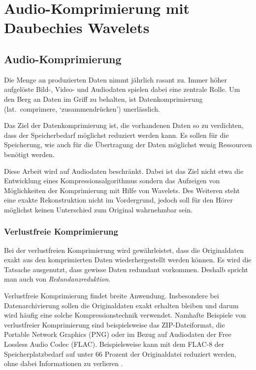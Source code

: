 %
%
%
\chapter{Audio-Komprimierung mit Daubechies Wavelets\label{chapter:compress}}
\begin{refsection}

\section{Audio-Komprimierung}
Die Menge an produzierten Daten nimmt jährlich rasant zu.
Immer höher aufgelöste Bild-, Video- und Audiodaten spielen dabei eine zentrale Rolle.
Um den Berg an Daten im Griff zu behalten, ist Datenkomprimierung (lat.~comprimere, `zusammendrücken') unerlässlich. 
%

Das Ziel der Datenkomprimierung ist, die vorhandenen Daten so zu verdichten, dass der Speicherbedarf möglichst reduziert werden kann.
Es sollen für die Speicherung, wie auch für die Übertragung der Daten möglichst wenig Ressourcen benötigt werden.

Diese Arbeit wird auf Audiodaten beschränkt.
Dabei ist das Ziel nicht etwa die Entwicklung eines Kompressionsalgorithmus sondern das Aufzeigen von Möglichkeiten der Komprimierung mit Hilfe von Wavelets.
Des Weiteren steht eine exakte Rekonstruktion nicht im Vordergrund, jedoch soll für den Hörer möglichst keinen Unterschied zum Original wahrnehmbar sein.

\subsection{Verlustfreie Komprimierung}
Bei der verlustfreien Komprimierung wird gewährleistet, dass die Originaldaten exakt aus den komprimierten Daten wiederhergestellt werden können.
Es wird die Tatsache ausgenutzt, dass gewisse Daten redundant vorkommen. 
Deshalb spricht man auch von {\em Redundanzreduktion}.
%

Verlustfreie Komprimierung findet breite Anwendung.
Insbesondere bei Datenarchivierung sollen die Originaldaten exakt erhalten bleiben und darum wird häufig eine solche Kompressionstechnik verwendet.
Namhafte Beispiele von verlustfreier Komprimierung sind beispielsweise das ZIP-Dateiformat, die Portable Network Graphics (PNG) oder im Bezug auf Audiodaten der Free Lossless Audio Codec (FLAC).
%
%
%
%
%
Beispielsweise kann mit dem FLAC-8 der Speicherplatzbedarf auf unter 66 Prozent der Originaldatei reduziert werden, ohne dabei Informationen zu verlieren \cite{wikipedia:flac}.


\end{refsection}
